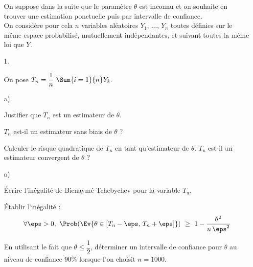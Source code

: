 \documentclass[11pt]{article}%
\begin{document}
\noindent
On suppose dans la suite que le paramètre $\theta$ est inconnu et on
souhaite en trouver une estimation ponctuelle puis par intervalle de
confiance.\\
On considère pour cela $n$ variables aléatoires $Y_1$, $\ldots$, $Y_n$
toutes définies sur le même espace probabilisé, mutuellement
indépendantes, et suivant toutes la même loi que $Y$.
\begin{noliste}{1.}
  \setlength{\itemsep}{4mm} %
  \setcounter{enumi}{7}
\item On pose $T_n = \dfrac{1}{n} \ \Sum{i=1}{n} Y_k$.
  \begin{noliste}{a)}
    \setlength{\itemsep}{2mm}
  \item Justifier que $T_n$ est un estimateur de $\theta$.
    
  \item $T_n$ est-il un estimateur sans biais de $\theta$ ?
    
  \item Calculer le risque quadratique de $T_n$ en tant qu'estimateur
    de $\theta$. $T_n$ est-il un estimateur convergent de $\theta$ ?
  \end{noliste}
  
\item
  \begin{noliste}{a)}
    \setlength{\itemsep}{2mm}
  \item Écrire l'inégalité de Bienaymé-Tchebychev pour la variable
    $T_n$.
    
  \item Établir l'inégalité :
    \[
      \forall \eps >0, \ \Prob(\Ev{\theta \in [T_n - \eps, \, T_n +
        \eps]}) \ \geq \ 1- \dfrac{\theta^2}{n \, \eps^2}
    \]
    
  \item En utilisant le fait que $\theta \leq \dfrac{1}{2}$,
    déterminer un intervalle de confiance pour $\theta$ au niveau de
    confiance $90 \%$ lorsque l'on choisit $n=1000$.
  \end{noliste}
\end{noliste}
\end{document}
